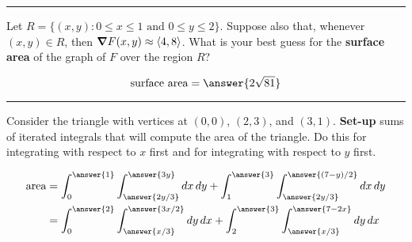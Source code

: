 \documentclass{ximera}
\begin{document}
\hrule
\begin{problem}
  Let $R = \{ (x,y) : 0 \leq x \leq 1 \text{ and } 0 \leq y \leq 2
  \}$.  Suppose also that, whenever $(x,y) \in R$, then $\boldsymbol\nabla F(x,y)
  \approx \left\langle 4,8\right\rangle$.  What is your best guess for the \textbf{surface area}
  of the graph of $F$ over the region $R$? 
  \begin{prompt}
    \[
    \text{surface area} =\answer{2\sqrt{81}}
    \]
  \end{prompt}
\end{problem}

\vfill

\hrule

\begin{problem}
  Consider the triangle with vertices at $(0,0)$, $(2,3)$, and
  $(3,1)$. \textbf{Set-up} sums of iterated integrals that will
  compute the area of the triangle. Do this for integrating with respect to $x$ first and for integrating with respect to $y$ first. 
  \begin{prompt}
    \begin{align*}
      \text{area} &=\int_0^{\answer{1}} \int_{\answer{2y/3}}^{\answer{3y}} \d x \d y + \int_1^{\answer{3}} \int_{\answer{2y/3}}^{\answer{(7-y)/2}} \d x \d y\\
     &=\int_0^{\answer{2}} \int_{\answer{x/3}}^{\answer{3x/2}} \d y \d x +\int_2^{\answer{3}} \int_{\answer{x/3}}^{\answer{7-2x}} \d y \d x 
    \end{align*}
  \end{prompt}
  \vfill
\end{problem}
\end{document}
